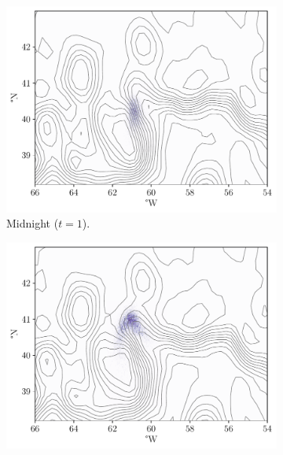 \begin{figure}
	\centering
	\begin{subfigure}{0.49\textwidth}
		\includegraphics[width=\textwidth]{chp06_applications/figures/gulf_stream/rels_ssh_1.0}
		\caption{Midnight  (\(t = 1\)).}
		\label{fig:na_hist_t3_1}
	\end{subfigure}
	\begin{subfigure}{0.49\textwidth}
		\includegraphics[width=\textwidth]{chp06_applications/figures/gulf_stream/rels_ssh_2.0}

\end{subfigure}
\end{figure}

